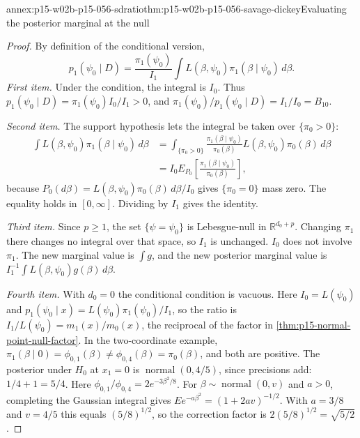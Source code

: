 \begin{annexitem}{annex:p15-w02b-p15-056-sdratio}{thm:p15-w02b-p15-056-savage-dickey}{Evaluating the posterior marginal at the null}
\begin{proof}
By definition of the conditional version,
\[
 p_1(\psi_0\mid D)=\frac{\pi_1(\psi_0)}{I_1}
 \int L(\beta,\psi_0)\pi_1(\beta\mid\psi_0)\,d\beta .
\]
\emph{First item.} Under the condition, the integral is \(I_0\). Thus
\(p_1(\psi_0\mid D)=\pi_1(\psi_0)I_0/I_1>0\), and
\(\pi_1(\psi_0)/p_1(\psi_0\mid D)=I_1/I_0=B_{10}\).

\emph{Second item.} The support hypothesis lets the integral be taken
over \(\{\pi_0>0\}\):
\[
\begin{split}
 \int L(\beta,\psi_0)\pi_1(\beta\mid\psi_0)\,d\beta
 &=\int_{\{\pi_0>0\}}\frac{\pi_1(\beta\mid\psi_0)}{\pi_0(\beta)}
 L(\beta,\psi_0)\pi_0(\beta)\,d\beta\\
 &=I_0E_{P_0}\!\left[\frac{\pi_1(\beta\mid\psi_0)}{\pi_0(\beta)}\right],
\end{split}
\]
because \(P_0(d\beta)=L(\beta,\psi_0)\pi_0(\beta)\,d\beta/I_0\) gives
\(\{\pi_0=0\}\) mass zero. The equality holds in \([0,\infty]\).
Dividing by \(I_1\) gives the identity.

\emph{Third item.} Since \(p\geq1\), the set \(\{\psi=\psi_0\}\) is
Lebesgue-null in \(\mathbb R^{d_0+p}\). Changing \(\pi_1\) there changes
no integral over that space, so \(I_1\) is unchanged. \(I_0\) does not
involve \(\pi_1\). The new marginal value is \(\int g\), and the new
posterior marginal value is \(I_1^{-1}\int L(\beta,\psi_0)g(\beta)\,d\beta\).

\emph{Fourth item.} With \(d_0=0\) the conditional condition is vacuous.
Here \(I_0=L(\psi_0)\) and \(p_1(\psi_0\mid x)=L(\psi_0)\pi_1(\psi_0)/I_1\),
so the ratio is \(I_1/L(\psi_0)=m_1(x)/m_0(x)\), the reciprocal of the
factor in \cref{thm:p15-normal-point-null-factor}. In the two-coordinate
example, \(\pi_1(\beta\mid0)=\phi_{0,1}(\beta)\neq\phi_{0,4}(\beta)=\pi_0(\beta)\),
and both are positive. The posterior under \(H_0\) at \(x_1=0\) is
\(\operatorname{normal}(0,4/5)\), since precisions add:
\(1/4+1=5/4\). Here \(\phi_{0,1}/\phi_{0,4}=2e^{-3\beta^2/8}\). For
\(\beta\sim\operatorname{normal}(0,v)\) and \(a>0\), completing the
Gaussian integral gives \(Ee^{-a\beta^2}=(1+2av)^{-1/2}\). With
\(a=3/8\) and \(v=4/5\) this equals \((5/8)^{1/2}\), so the correction
factor is \(2(5/8)^{1/2}=\sqrt{5/2}\).
\end{proof}
\end{annexitem}

